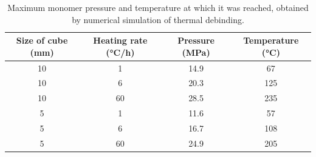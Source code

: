 \documentclass{article}
\begin{document}
\begin{table}
    \centering
    \caption{
        Maximum monomer pressure and temperature at which it was reached, obtained by numerical simulation of thermal debinding.
    }\label{table:tb:pressure}
    \centering
    \footnotesize
    \begin{tabular}{cccc}
        \hline
        Size of cube (\si{\mm}) & Heating rate (\si{\celsius/\hour})
            & Pressure (\si{\MPa}) & Temperature (\si{\celsius}) \\
        \hline
        10 & 1  & 14.9 & 67  \\
        10 & 6  & 20.3 & 125 \\
        10 & 60 & 28.5 & 235 \\
        5  & 1  & 11.6 & 57  \\
        5  & 6  & 16.7 & 108 \\
        5  & 60 & 24.9 & 205 \\
        \hline
    \end{tabular}
\end{table}
\end{document}
